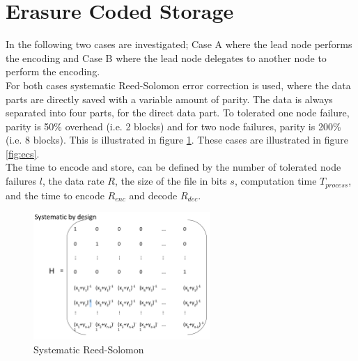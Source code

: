 \section{Erasure Coded Storage} \label{sec:ec}
In the following two cases are investigated; Case A where the lead node performs the encoding and Case B where the lead node delegates to another node to perform the encoding.\\
For both cases systematic Reed-Solomon error correction is used, where the data parts are directly saved with a variable amount of parity. The data is always separated into four parts, for the direct data part. To tolerated one node failure, parity is 50\% overhead (i.e. 2 blocks) and for two node failures, parity is 200\% (i.e. 8 blocks). This is illustrated in figure \ref{fig:rs_sys}. These cases are illustrated in figure \ref{fig:ecs}.\\ 
The time to encode and store, can be defined by the number of tolerated node failures $l$, the data rate $R$, the size of the file in bits $s$, computation time $T_{process}$, and the time to encode $R_{enc}$ and decode $R_{dec}$.

\begin{figure}[H]
	\centering
	\includegraphics[width=0.6\textwidth]{figures/rs_sys}
	\caption{Systematic Reed-Solomon}
	\label{fig:rs_sys}
\end{figure}


